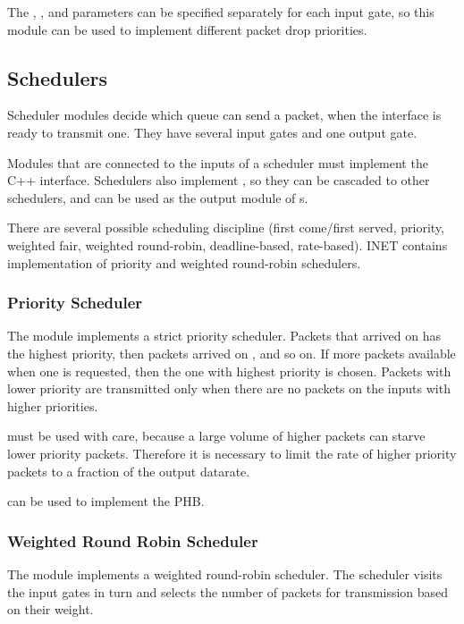 The , , and  parameters
can be specified separately for each input gate, so this module
can be used to implement different packet drop priorities.

\subsection{Schedulers}

Scheduler modules decide which queue can send a packet, when the
interface is ready to transmit one. They have several input gates
and one output gate.

Modules that are connected to the inputs of a scheduler must
implement the  C++ interface.
Schedulers also implement , so
they can be cascaded to other schedulers, and can be used
as the output module of s.

There are several possible scheduling discipline (first come/first served,
priority, weighted fair, weighted round-robin, deadline-based,
rate-based). INET contains implementation
of priority and weighted round-robin schedulers.

\subsubsection{Priority Scheduler}

The  module implements a strict priority
scheduler. Packets that arrived on  has the highest priority,
then packets arrived on , and so on. If more packets
available when one is requested, then the one with highest priority
is chosen. Packets with lower priority are transmitted only when
there are no packets on the inputs with higher priorities.

 must be used with care, because a
large volume of higher packets can starve lower priority packets.
Therefore it is necessary to limit the rate of higher priority
packets to a fraction of the output datarate.

 can be used to implement
the  PHB.

\subsubsection*{Weighted Round Robin Scheduler}

The  module implements a weighted
round-robin scheduler. The scheduler visits the input gates
in turn and selects the number of packets for transmission
based on their weight.

